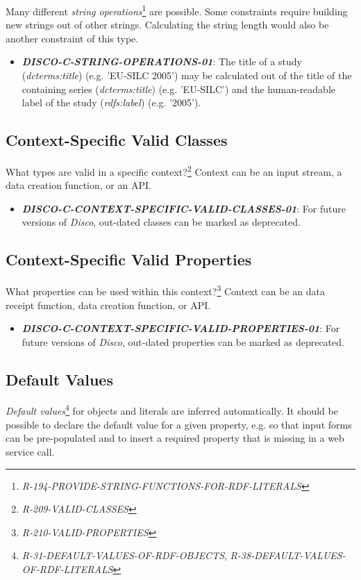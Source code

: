 \documentclass{llncs}
\begin{document}
Many different \emph{string operations}\footnote{\emph{R-194-PROVIDE-STRING-FUNCTIONS-FOR-RDF-LITERALS}} are possible.
Some constraints require building new strings out of other strings.
Calculating the string length would also be another constraint of this type.

\begin{itemize}
	\item \textbf{{\em DISCO-C-STRING-OPERATIONS-01}}: The title of a study (\emph{dcterms:title}) (e.g. 'EU-SILC 2005') may be calculated out of the title of the containing series (\emph{dcterms:title}) (e.g. 'EU-SILC') and the human-readable label of the study (\emph{rdfs:label}) (e.g. '2005').   
\end{itemize}

\subsection{Context-Specific Valid Classes}

What types are valid in a specific context?\footnote{\emph{R-209-VALID-CLASSES}} 
Context can be an input stream, a data creation function, or an API.

\begin{itemize}
	\item \textbf{{\em DISCO-C-CONTEXT-SPECIFIC-VALID-CLASSES-01}}: For future versions of \emph{Disco}, out-dated classes can be marked as deprecated.
\end{itemize}

\subsection{Context-Specific Valid Properties}

What properties can be used within this context?\footnote{\emph{R-210-VALID-PROPERTIES}} 
Context can be an data receipt function, data creation function, or API.

\begin{itemize}
	\item \textbf{{\em DISCO-C-CONTEXT-SPECIFIC-VALID-PROPERTIES-01}}: For future versions of \emph{Disco}, out-dated properties can be marked as deprecated.
\end{itemize}

\subsection{Default Values}

\emph{Default values}\footnote{{\em R-31-DEFAULT-VALUES-OF-RDF-OBJECTS}, {\em R-38-DEFAULT-VALUES-OF-RDF-LITERALS}} for objects and literals are inferred automatically.
It should be possible to declare the default value for a given property, e.g. so that input forms can be pre-populated and to insert a required property that is missing in a web service call.
\end{document}
